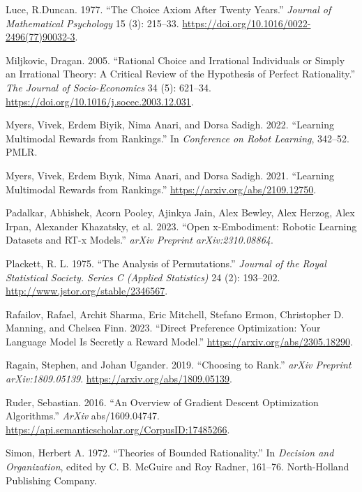 \documentclass[
  letterpaper,
  numbers=noenddot,
  DIV=11]{scrreprt}
\newlength{\cslhangindent}
\newenvironment{CSLReferences}[2] %
 {\begin{list}{}{%
  \setlength{\itemindent}{0pt}
  \setlength{\leftmargin}{0pt}
  \setlength{\parsep}{0pt}
  \ifodd #1
   \setlength{\leftmargin}{\cslhangindent}
   \setlength{\itemindent}{-1\cslhangindent}
  \fi
  \setlength{\itemsep}{#2\baselineskip}}}
 {\end{list}}
\theoremstyle{definition}
\theoremstyle{plain}
\theoremstyle{plain}
\theoremstyle{remark}
\begin{document}
\begin{CSLReferences}{1}{0}
Luce, R.Duncan. 1977. {``The Choice Axiom After Twenty Years.''}
\emph{Journal of Mathematical Psychology} 15 (3): 215--33.
\url{https://doi.org/10.1016/0022-2496(77)90032-3}.

Miljkovic, Dragan. 2005. {``Rational Choice and Irrational Individuals
or Simply an Irrational Theory: A Critical Review of the Hypothesis of
Perfect Rationality.''} \emph{The Journal of Socio-Economics} 34 (5):
621--34. \url{https://doi.org/10.1016/j.socec.2003.12.031}.

Myers, Vivek, Erdem Biyik, Nima Anari, and Dorsa Sadigh. 2022.
{``Learning Multimodal Rewards from Rankings.''} In \emph{Conference on
Robot Learning}, 342--52. PMLR.

Myers, Vivek, Erdem Bıyık, Nima Anari, and Dorsa Sadigh. 2021.
{``Learning Multimodal Rewards from Rankings.''}
\url{https://arxiv.org/abs/2109.12750}.

Padalkar, Abhishek, Acorn Pooley, Ajinkya Jain, Alex Bewley, Alex
Herzog, Alex Irpan, Alexander Khazatsky, et al. 2023. {``Open
x-Embodiment: Robotic Learning Datasets and RT-x Models.''} \emph{arXiv
Preprint arXiv:2310.08864}.

Plackett, R. L. 1975. {``The Analysis of Permutations.''} \emph{Journal
of the Royal Statistical Society. Series C (Applied Statistics)} 24 (2):
193--202. \url{http://www.jstor.org/stable/2346567}.

Rafailov, Rafael, Archit Sharma, Eric Mitchell, Stefano Ermon,
Christopher D. Manning, and Chelsea Finn. 2023. {``Direct Preference
Optimization: Your Language Model Is Secretly a Reward Model.''}
\url{https://arxiv.org/abs/2305.18290}.

Ragain, Stephen, and Johan Ugander. 2019. {``Choosing to Rank.''}
\emph{arXiv Preprint arXiv:1809.05139}.
\url{https://arxiv.org/abs/1809.05139}.

Ruder, Sebastian. 2016. {``An Overview of Gradient Descent Optimization
Algorithms.''} \emph{ArXiv} abs/1609.04747.
\url{https://api.semanticscholar.org/CorpusID:17485266}.

Simon, Herbert A. 1972. {``Theories of Bounded Rationality.''} In
\emph{Decision and Organization}, edited by C. B. McGuire and Roy
Radner, 161--76. North-Holland Publishing Company.


\end{CSLReferences}
\end{document}
